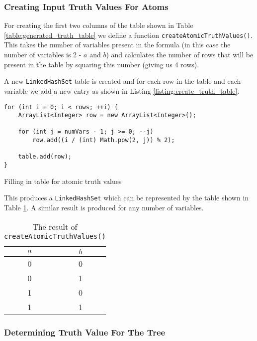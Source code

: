 \documentclass[draft]{report}
\begin{document}
\subsubsection{Creating Input Truth Values For Atoms}

For creating the first two columns of the table shown in Table \ref{table:generated_truth_table} we define a function {\tt createAtomicTruthValues()}. This takes the number of variables present in the formula (in this case the number of variables is 2 - $a$ and $b$) and calculates the number of rows that will be present in the table by squaring this number (giving us 4 rows).

A new {\tt LinkedHashSet} table is created and for each row in the table and each variable we add a new entry as shown in Listing \ref{listing:create_truth_table}.

\begin{listing}[ht]
\begin{verbatim} 
for (int i = 0; i < rows; ++i) {
    ArrayList<Integer> row = new ArrayList<Integer>();

    for (int j = numVars - 1; j >= 0; --j)
        row.add((i / (int) Math.pow(2, j)) % 2);

    table.add(row);
}
\end{verbatim}
\caption{Filling in table for atomic truth values}
\label{listing:create_truth_table}
\end{listing}

This produces a {\tt LinkedHashSet} which can be represented by the table shown in Table \ref{table:generated_atomic_truth_values}. A similar result is produced for any number of variables.

\begin{table}[h]
  \begin{center}
    \begin{tabular}{ | c | c | }
      \hline
      $a$ & $b$ \\ \hline
      0 & 0 \\
      0 & 1 \\
      1 & 0 \\
      1 & 1 \\
      \hline
    \end{tabular}
  \end{center}
  \caption{The result of {\tt createAtomicTruthValues()}}
  \label{table:generated_atomic_truth_values}
\end{table}

\subsubsection{Determining Truth Value For The Tree}
\end{document}
